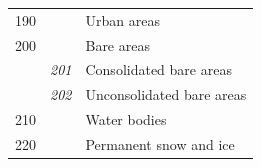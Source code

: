 \begin{table}[htbp]
\begin{tabular}{lll}
    190                      &                      & Urban areas                                                         \\
    200                      &                      & Bare areas                                                          \\
                             & \textit{201}         & Consolidated bare areas                                             \\
                             & \textit{202}         & Unconsolidated bare areas                                           \\
    210                      &                      & Water bodies                                                        \\
    220                      &                      & Permanent snow and ice                                              \\ \bottomrule
  \end{tabular}
\end{table}

